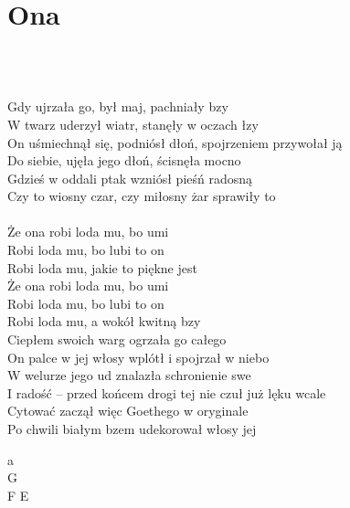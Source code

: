 \documentclass[a5paper, 10pt]{book}
\begin{document}
\section{Ona}\textcolor{lightgray}{\textit{}}\\~\\
\begin{minipage}[t]{0.8\textwidth}
Gdy ujrzała go, był maj, pachniały bzy\\
W twarz uderzył wiatr, stanęły w oczach łzy\\
On uśmiechnął się, podniósł dłoń, spojrzeniem przywołał ją\\
Do siebie, ujęła jego dłoń, ścisnęła mocno\\
Gdzieś w oddali ptak wzniósł pieśń radosną\\
Czy to wiosny czar, czy miłosny żar sprawiły to\\
\\
\hspace*{5mm}Że ona robi loda mu, bo umi\\
\hspace*{5mm}Robi loda mu, bo lubi to on\\
\hspace*{5mm}Robi loda mu, jakie to piękne jest\\
\hspace*{5mm}Że ona robi loda mu, bo umi\\
\hspace*{5mm}Robi loda mu, bo lubi to on\\
\hspace*{5mm}Robi loda mu, a wokół kwitną bzy\\

Ciepłem swoich warg ogrzała go całego\\
On palce w jej włosy wplótł i spojrzał w niebo\\
W welurze jego ud znalazła schronienie swe\\
I radość – przed końcem drogi tej nie czuł już lęku wcale\\
Cytować zaczął więc Goethego w oryginale\\
Po chwili białym bzem udekorował włosy jej\\

\end{minipage}
\begin{minipage}[t]{0.2\textwidth}
a\\
G\\
F E\\
\end{minipage}
\end{document}
